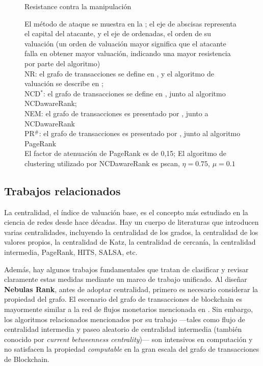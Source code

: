 \begin{figure}[htbp]
	\caption{Resistance contra la manipulación} \label{fig:antiManipulation}
	\caption*{\footnotesize{El método de ataque se muestra en la ; el eje de abscisas representa el capital del atacante, y el eje de ordenadas, el orden de su valuación (un orden de valuación mayor significa que el atacante falla en obtener mayor valuación, indicando una mayor resistencia por parte del algoritmo)  \\
	NR: el grafo de transacciones se define en , y el algoritmo de valuación se describe en ; \\
	NCD$^*$: el grafo de transacciones se define en , junto al algoritmo NCDawareRank; \\
	NEM: el grafo de transacciones es presentado por \cite{nem}, junto a NCDawareRank\\
	PR$^{\#}$: el grafo de transacciones es presentado por \cite{nem}, junto al algoritmo PageRank\\
	El factor de atenuación de PageRank es de 0,15; El algoritmo de clustering utilizado por NCDawareRank es pscan\cite{chang2017mathsf}, $\eta=0.75$, $\mu=0.1$}}
\end{figure}

\subsection{Trabajos relacionados} \label{subsec:related}

La centralidad, el índice de valuación base, es el concepto más estudiado en la ciencia de redes desde hace décadas\cite{newman2010networks}. Hay un cuerpo de literaturas que introducen varias centralidades, incluyendo la centralidad de los grados\cite{freeman1979set}, la centralidad de los valores propios\cite{bonacich1972factoring}, la centralidad de Katz\cite{katz1953new}, la centralidad de cercanía\cite{sabidussi1966centrality}, la centralidad intermedia\cite{freeman1977set}\cite{freeman1978centrality}\cite{freeman1991centrality}\cite{noh2004random}\cite{newman2005measure}, PageRank\cite{Brin2010}, HITS\cite{kleinberg1999authoritative}, SALSA\cite{Science2001}, etc.

Además, hay algunos trabajos fundamentales que tratan de clasificar y revisar claramente estas medidas mediante un marco de trabajo unificado\cite{Borgatti2005}\cite{Borgatti2006}\cite{Lu2016}. Al diseñar \textbf{Nebulas Rank}, antes de adoptar centralidad, primero es necesario considerar la propiedad del grafo. El escenario del grafo de transacciones de blockchain es mayormente similar a la red de flujos monetarios mencionada en \cite{Borgatti2005}. Sin embargo, los algoritmos relacionados mencionados por su trabajo —tales como flujo de centralidad intermedia\cite{freeman1991centrality} y paseo aleatorio de centralidad intermedia (también conocido por \textit{current betweenness centrality})\cite{newman2005measure}— son intensivos en computación y no satisfacen la propiedad \textit{computable} en la gran escala del grafo de transacciones de Blockchain.

